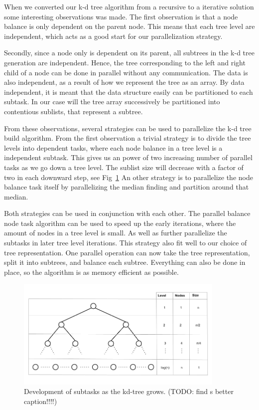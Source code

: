 When we converted our k-d tree algorithm from a recursive to a iterative solution some interesting observations was made. The first observation is that a node balance is only dependent on the parent node. This means that each tree level are independent, which acts as a good start for our parallelization strategy.

Secondly, since a node only is dependent on its parent, all subtrees in the k-d tree generation are independent. Hence, the tree corresponding to the left and right child of a node can be done in parallel without any communication. The data is also independent, as a result of how we represent the tree as an array. By data independent, it is meant that the data structure easily can be partitioned to each subtask. In our case will the tree array successively be partitioned into contentious sublists, that represent a subtree.

From these observations, several strategies can be used to parallelize the k-d tree build algorithm. From the first observation a trivial strategy is to divide the tree levels into dependent tasks, where each node balance in a tree level is a independent subtask. This gives us an power of two increasing number of parallel tasks as we go down a tree level. The sublist size will decrease with a factor of two in each downward step, see Fig~\ref{fig:tree_level_development} An other strategy is to parallelize the node balance task itself by parallelizing the median finding and partition around that median.

Both strategies can be used in conjunction with each other. The parallel balance node task algorithm can be used to speed up the early iterations, where the amount of nodes in a tree level is small. As well as further parallelize the subtasks in later tree level iterations. This strategy also fit well to our choice of tree representation. One parallel operation can now take the tree representation, split it into subtrees, and balance each subtree. Everything can also be done in place, so the algorithm is as memory efficient as possible.




\begin{figure}[ht!]
\centering
\includegraphics[width=100mm]{../gfx/Tree_level_development.png}

\caption{Development of subtasks as the kd-tree grows. (TODO: find s better caption!!!!) }
\label{fig:tree_level_development}
\end{figure}


